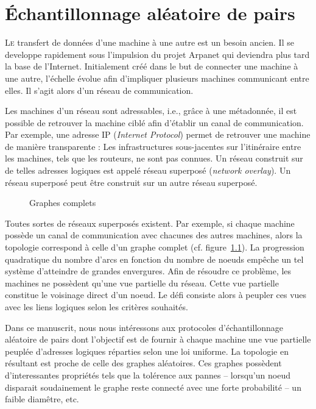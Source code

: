 
\chapter{Échantillonnage aléatoire de pairs}
\label{net:chap:rps}
\minitoc

\lettrine{L}e transfert de données d'une machine à une autre est un besoin
ancien. Il se developpe rapidement sous l'impulsion du projet Arpanet qui
deviendra plus tard la base de l'Internet. Initialement créé dans le but de
connecter une machine à une autre, l'échelle évolue afin d'impliquer plusieurs
machines communicant entre elles. Il s'agit alors d'un réseau de communication.

Les machines d'un réseau sont adressables, i.e., grâce à une métadonnée, il est
possible de retrouver la machine ciblé afin d'établir un canal de
communication. Par exemple, une adresse IP (\emph{Internet Protocol}) permet de
retrouver une machine de manière transparente : Les infrastructures
sous-jacentes sur l'itinéraire entre les machines, tels que les routeurs, ne
sont pas connues. Un réseau construit sur de telles adresses logiques est appelé
réseau superposé (\emph{network overlay}). Un réseau superposé peut être
construit sur un autre réseau superposé.

\begin{figure}
  \centering 
  
  \caption{\label{net:fig:completegraph}Graphes complets}
\end{figure}

Toutes sortes de réseaux superposés existent. Par exemple, si chaque machine
possède un canal de communication avec chacunes des autres machines, alors la
topologie correspond à celle d'un graphe complet
(cf. figure~\ref{net:fig:completegraph}). La progression quadratique du nombre
d'arcs en fonction du nombre de noeuds empêche un tel système d'atteindre de
grandes envergures. Afin de résoudre ce problème, les machines ne possèdent
qu'une vue partielle du réseau. Cette vue partielle constitue le voisinage
direct d'un noeud. Le défi consiste alors à peupler ces vues avec les liens
logiques selon les critères souhaités.

Dans ce manuscrit, nous nous intéressons aux protocoles d'échantillonnage
aléatoire de pairs dont l'objectif est de fournir à chaque machine une vue
partielle peuplée d'adresses logiques réparties selon une loi uniforme. La
topologie en résultant est proche de celle des graphes aléatoires. Ces graphes
possèdent d'interessantes propriétés tels que la tolérence aux pannes --
lorsqu'un noeud disparait soudainement le graphe reste connecté avec une forte
probabilité -- un faible diamêtre, etc.

